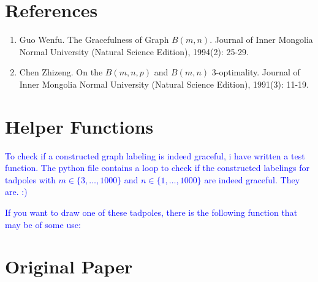 \documentclass[fleqn,svgnames,screen,acmsmall]{ml2rcn}
\newcommand{\additionalcomment}[1]{\textcolor{blue}{#1}}
\begin{document}
\section{References}\label{references}
\begin{enumerate}
  \item\label{citeoriginal}
  Guo Wenfu. The Gracefulness of Graph $B(m,n)$. 
  Journal of Inner Mongolia Normal University (Natural Science Edition), 1994(2): 25-29.
  \item\label{cite1}
  Chen Zhizeng. On the $B(m,n,p)$ and $B(m,n)$ $3$-optimality. Journal of Inner Mongolia Normal University (Natural Science Edition), 1991(3): 11-19.
\end{enumerate}


\appendix

\section{Helper Functions}

\additionalcomment{To check if a constructed graph labeling is indeed graceful, i have written a test function. The python file contains a loop to check if the constructed labelings for tadpoles with $m \in \{3, \ldots, 1000\}$ and $n \in \{1, \ldots, 1000\}$ are indeed graceful. They are. :)} 

\vspace{0.5\baselineskip}

\additionalcomment{If you want to draw one of these tadpoles, there is the following function that may be of some use:}

\vspace{0.5\baselineskip}

\section{Original Paper}
\label{apxoriginal}


\end{document}
